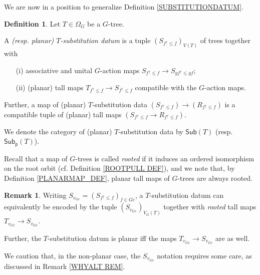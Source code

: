 \documentclass[a4paper,10pt
,draft
]{article}%
\numberwithin{equation}{section}
\numberwithin{figure}{section}
\theoremstyle{definition} %
\newtheorem{definition}[equation]{Definition}%
\newtheorem{remark}[equation]{Remark}%
\newcommand{\1}{\ensuremath{\mathbbm 1}}%
\begin{document}
We are now in a position to generalize 
Definition \ref{SUBSTITUTIONDATUM}.

\begin{definition}\label{SUBSTITUTIONDATUMG DEF}
	Let $T \in \Omega_G$ be a $G$-tree.
	
	A \textit{(resp. planar) $T$-substitution datum} is a tuple 
	$\left(S_{f^{\uparrow} \leq f} \right)_{V(T)}$ of trees together with
\begin{itemize}	
\item[(i)] associative and unital $G$-action maps
	$S_{f^{\uparrow} \leq f} \to S_{g f^{\uparrow} \leq g f}$; 
\item[(ii)]	(planar) tall maps 
	$T_{f^{\uparrow} \leq f} \to S_{f^{\uparrow} \leq f}$ compatible with the $G$-action maps.
\end{itemize}	
	Further, a map of (planar) $T$-substitution data 
	$\left(S_{f^{\uparrow} \leq f}\right) \to
	\left(R_{f^{\uparrow} \leq f}\right)$ is a compatible tuple of (planar) tall maps 
	$\left(S_{f^{\uparrow} \leq f} \to R_{f^{\uparrow} \leq f} \right)$.
	
	We denote the category of (planar) $T$-substitution data 
	by $\mathsf{Sub}(T)$
	(resp. $\mathsf{Sub}_{\mathsf{p}}(T)$).
\end{definition}


Recall that a map of $G$-trees is called 
\textit{rooted} if it induces an ordered isomorphism on the root orbit (cf. Definition \ref{ROOTPULL DEF}),
and we note that, by Definition \ref{PLANARMAP_DEF}, planar tall maps of $G$-trees are always rooted.


\begin{remark}\label{SUBSGREF DEF}
Writing $S_{v_{G e}} = (S_{f^{\uparrow} \leq f})_{f \in Ge}$,
a $T$-substitution datum can equivalently be encoded by the tuple
$\left(S_{v_{G e}}\right)_{V_G(T)}$ together with \textit{rooted} tall maps 
$T_{v_{Ge}} \to S_{v_{G e}}$.

Further, the $T$-substitution datum is planar iff the maps $T_{v_{Ge}} \to S_{v_{G e}}$ are as well.

We caution that, in the non-planar case, the
$S_{v_{G e}}$ notation requires some care,
as discussed in Remark \ref{WHYALT REM}. 
\end{remark}
\end{document}
